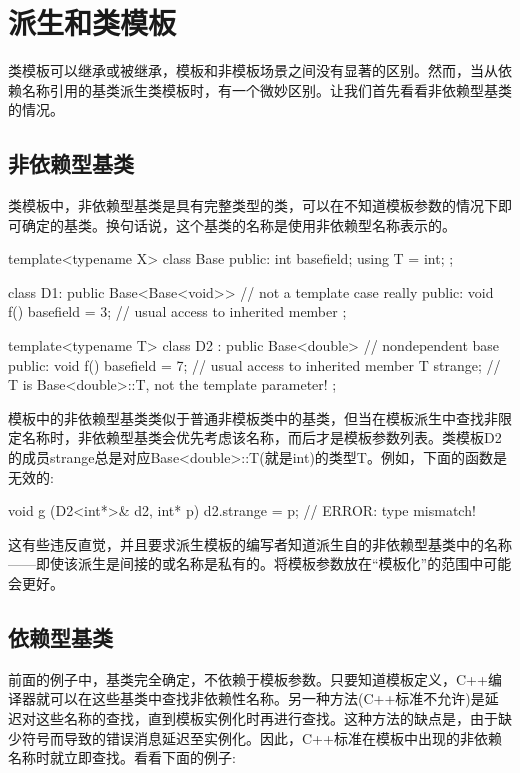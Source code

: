 \section{派生和类模板}

类模板可以继承或被继承，模板和非模板场景之间没有显著的区别。然而，当从依赖名称引用的基类派生类模板时，有一个微妙区别。让我们首先看看非依赖型基类的情况。

\subsection{非依赖型基类}

类模板中，非依赖型基类是具有完整类型的类，可以在不知道模板参数的情况下即可确定的基类。换句话说，这个基类的名称是使用非依赖型名称表示的。

\begin{cpp}
template<typename X>
class Base {
	public:
	int basefield;
	using T = int;
};

class D1: public Base<Base<void>> { // not a template case really
	public:
	void f() { basefield = 3; } // usual access to inherited member
};

template<typename T>
class D2 : public Base<double> { // nondependent base
	public:
	void f() { basefield = 7; } // usual access to inherited member
	T strange; // T is Base<double>::T, not the template parameter!
};
\end{cpp}

模板中的非依赖型基类类似于普通非模板类中的基类，但当在模板派生中查找非限定名称时，非依赖型基类会优先考虑该名称，而后才是模板参数列表。类模板D2的成员strange总是对应Base<double>::T(就是int)的类型T。例如，下面的函数是无效的:

\begin{cpp}
void g (D2<int*>& d2, int* p)
{
	d2.strange = p; // ERROR: type mismatch!
}
\end{cpp}

这有些违反直觉，并且要求派生模板的编写者知道派生自的非依赖型基类中的名称——即使该派生是间接的或名称是私有的。将模板参数放在“模板化”的范围中可能会更好。

\subsection{依赖型基类}

前面的例子中，基类完全确定，不依赖于模板参数。只要知道模板定义，C++编译器就可以在这些基类中查找非依赖性名称。另一种方法(C++标准不允许)是延迟对这些名称的查找，直到模板实例化时再进行查找。这种方法的缺点是，由于缺少符号而导致的错误消息延迟至实例化。因此，C++标准在模板中出现的非依赖名称时就立即查找。看看下面的例子:

